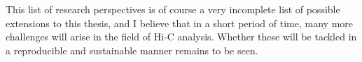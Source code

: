 This list of research perspectives is of course a very incomplete list of
possible extensions to this thesis, and I believe that in a short period of
time, many more challenges will arise in the field of Hi-C analysis. Whether
these will be tackled in a reproducible and sustainable manner remains to be
seen.

